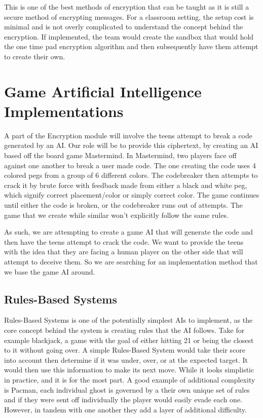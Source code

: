 \documentclass[onecolumn, draftclsnofoot,10pt, compsoc]{IEEEtran}
\begin{document}
This is one of the best methods of encryption that can be taught as it is still a secure method of encrypting messages. For a classroom setting, the setup cost is minimal and is not overly complicated to understand the concept behind the encryption. If implemented, the team would create the sandbox that would hold the one time pad encryption algorithm and then subsequently have them attempt to create their own.

\section{Game Artificial Intelligence Implementations}
A part of the Encryption module will involve the teens attempt to break a code generated by an AI. Our role will be to provide this ciphertext, by creating an AI based off the board game Mastermind. In Mastermind, two players face off against one another to break a user made code. The one creating the code uses 4 colored pegs from a group of 6 different colors. The codebreaker then attempts to crack it by brute force with feedback made from either a black and white peg, which signify correct placement/color or simply correct color. The game continues until either the code is broken, or the codebreaker runs out of attempts. The game that we create while similar won't explicitly follow the same rules.

As such, we are attempting to create a game AI that will generate the code and then have the teens attempt to crack the code. We want to provide the teens with the idea that they are facing a human player on the other side that will attempt to deceive them. So we are searching for an implementation method that we base the game AI around. 
\subsection{Rules-Based Systems}
Rules-Based Systems is one of the potentially simplest AIs to implement, as the core concept behind the system is creating rules that the AI follows. Take for example blackjack, a game with the goal of either hitting 21 or being the closest to it without going over. A simple Rules-Based System would take their score into account then determine if it was under, over, or at the expected target. It would then use this information to make its next move. While it looks simplistic in practice, and it is for the most part. A good example of additional complexity is Pacman, each individual ghost is governed by a their own unique set of rules and if they were sent off individually the player would easily evade each one. However, in tandem with one another they add a layer of additional difficulty.
\end{document}
